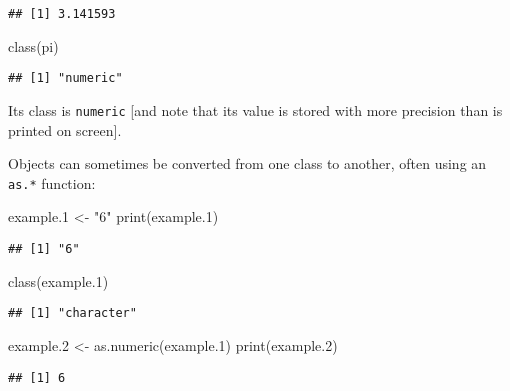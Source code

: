 \documentclass[
]{article}
\newenvironment{Shaded}{\begin{snugshade}}{\end{snugshade}}
\newcommand{\FloatTok}[1]{\textcolor[rgb]{0.00,0.00,0.81}{#1}}
\newcommand{\FunctionTok}[1]{\textcolor[rgb]{0.00,0.00,0.00}{#1}}
\newcommand{\NormalTok}[1]{#1}
\newcommand{\OtherTok}[1]{\textcolor[rgb]{0.56,0.35,0.01}{#1}}
\newcommand{\StringTok}[1]{\textcolor[rgb]{0.31,0.60,0.02}{#1}}
\begin{document}
\begin{verbatim}
## [1] 3.141593
\end{verbatim}

\begin{Shaded}
\begin{Highlighting}[]
\FunctionTok{class}\NormalTok{(pi)}
\end{Highlighting}
\end{Shaded}

\begin{verbatim}
## [1] "numeric"
\end{verbatim}

Its class is \texttt{numeric} {[}and note that its value is stored with more precision than is printed on screen{]}.

Objects can sometimes be converted from one class to another, often using an \texttt{as.*} function:

\begin{Shaded}
\begin{Highlighting}[]
\NormalTok{example}\FloatTok{.1} \OtherTok{\textless{}{-}} \StringTok{"6"}
\FunctionTok{print}\NormalTok{(example}\FloatTok{.1}\NormalTok{)}
\end{Highlighting}
\end{Shaded}

\begin{verbatim}
## [1] "6"
\end{verbatim}

\begin{Shaded}
\begin{Highlighting}[]
\FunctionTok{class}\NormalTok{(example}\FloatTok{.1}\NormalTok{)}
\end{Highlighting}
\end{Shaded}

\begin{verbatim}
## [1] "character"
\end{verbatim}

\begin{Shaded}
\begin{Highlighting}[]
\NormalTok{example}\FloatTok{.2} \OtherTok{\textless{}{-}} \FunctionTok{as.numeric}\NormalTok{(example}\FloatTok{.1}\NormalTok{)}
\FunctionTok{print}\NormalTok{(example}\FloatTok{.2}\NormalTok{)}
\end{Highlighting}
\end{Shaded}

\begin{verbatim}
## [1] 6
\end{verbatim}
\end{document}
